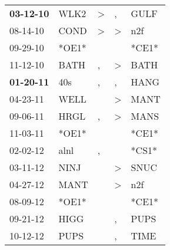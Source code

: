 \begin{supertabular}{p{0.07\textwidth}p{0.06\textwidth}p{0.02\textwidth}p{0.02\textwidth}p{0.06\textwidth}}
 \textbf{03-12-10\textsuperscript{}} &           WLK2\textsuperscript{} &     \textgreater &                , &          GULF\textsuperscript{} \\
          08-14-10\textsuperscript{} &           COND\textsuperscript{} &     \textgreater &     \textgreater &           n2f\textsuperscript{} \\
          09-29-10\textsuperscript{} &                            *OE1* &                  &                  &                           *CE1* \\
          11-12-10\textsuperscript{} &           BATH\textsuperscript{} &                , &     \textgreater &          BATH\textsuperscript{} \\
 \textbf{01-20-11\textsuperscript{}} &            40s\textsuperscript{} &                , &                , &          HANG\textsuperscript{} \\
          04-23-11\textsuperscript{} &           WELL\textsuperscript{} &                  &     \textgreater &          MANT\textsuperscript{} \\
          09-06-11\textsuperscript{} &           HRGL\textsuperscript{} &                , &     \textgreater &          MANS\textsuperscript{} \\
          11-03-11\textsuperscript{} &                            *OE1* &                  &                  &                           *CE1* \\
          02-02-12\textsuperscript{} &           alnl\textsuperscript{} &                , &                  &                           *CS1* \\
          03-11-12\textsuperscript{} &           NINJ\textsuperscript{} &                  &     \textgreater &          SNUC\textsuperscript{} \\
          04-27-12\textsuperscript{} &           MANT\textsuperscript{} &                  &     \textgreater &           n2f\textsuperscript{} \\
          08-09-12\textsuperscript{} &                            *OE1* &                  &                  &                           *CE1* \\
          09-21-12\textsuperscript{} &           HIGG\textsuperscript{} &                  &                , &          PUPS\textsuperscript{} \\
          10-12-12\textsuperscript{} &           PUPS\textsuperscript{} &                  &                , &          TIME\textsuperscript{} \\

\end{supertabular}
